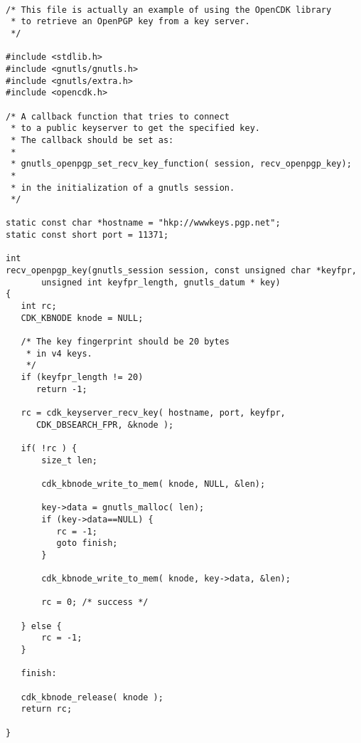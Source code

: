 \begin {verbatim}

/* This file is actually an example of using the OpenCDK library
 * to retrieve an OpenPGP key from a key server.
 */

#include <stdlib.h>
#include <gnutls/gnutls.h>
#include <gnutls/extra.h>
#include <opencdk.h>

/* A callback function that tries to connect
 * to a public keyserver to get the specified key.
 * The callback should be set as:
 *
 * gnutls_openpgp_set_recv_key_function( session, recv_openpgp_key);
 *
 * in the initialization of a gnutls session.
 */

static const char *hostname = "hkp://wwwkeys.pgp.net";
static const short port = 11371;

int
recv_openpgp_key(gnutls_session session, const unsigned char *keyfpr, 
       unsigned int keyfpr_length, gnutls_datum * key)
{
   int rc;
   CDK_KBNODE knode = NULL;

   /* The key fingerprint should be 20 bytes
    * in v4 keys.
    */
   if (keyfpr_length != 20)
      return -1;

   rc = cdk_keyserver_recv_key( hostname, port, keyfpr, 
      CDK_DBSEARCH_FPR, &knode );

   if( !rc ) {
       size_t len;

       cdk_kbnode_write_to_mem( knode, NULL, &len);

       key->data = gnutls_malloc( len);
       if (key->data==NULL) {
          rc = -1;
          goto finish;
       }

       cdk_kbnode_write_to_mem( knode, key->data, &len);

       rc = 0; /* success */

   } else {
       rc = -1;
   }

   finish:

   cdk_kbnode_release( knode );
   return rc;

}


\end{verbatim}
